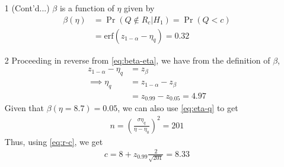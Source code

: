 \documentclass{beamer}
\providecommand{\pr}[1]{\ensuremath{\Pr\left(#1\right)}}
\providecommand{\erf}[1]{\ensuremath{\text{erf}(#1)}}
\begin{document}
\begin{frame}
	\begin{enumerate}
		\item[1] (Cont'd...) $\beta$ is a function of $\eta$ given by
			\begin{align}
				\beta(\eta) &= \pr{Q \notin R_c | H_1} = \pr{Q < c} \\
				&= \erf{z_{1 - \alpha} - \eta_q} = 0.32
				\label{eq:beta-eta}
			\end{align}
		\item[2] Proceeding in reverse from \eqref{eq:beta-eta}, we have from the definition of $\beta$, 
			\begin{align}
				z_{1 - \alpha} - \eta_q &= z_{\beta} \\
				\implies \eta_q &= z_{1 - \alpha} - z_{\beta} \\
				&= z_{0.99} - z_{0.05} = 4.97
				\label{eq:eta-q-rev}
			\end{align}
			Given that $\beta(\eta = 8.7) = 0.05$, we can also use \eqref{eq:eta-q} to get 
			\begin{align}
				n = \left(\frac{\sigma\eta_q}{\eta - \eta_0}\right)^2 = 201
				\label{eq:n}
			\end{align}
			Thus, using \eqref{eq:r-c}, we get 
			\begin{align}
				c = 8 + z_{0.99}\frac{2}{\sqrt{201}} = 8.33
				\label{eq:c-ans}
			\end{align}
	\end{enumerate}
\end{frame}
\end{document}
